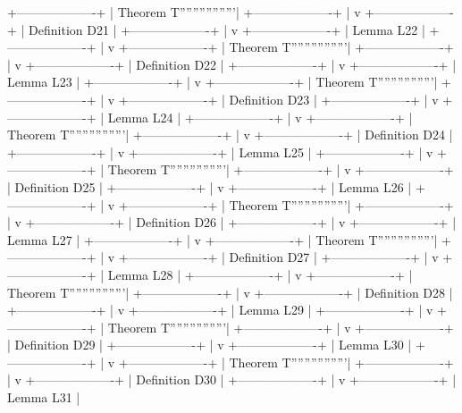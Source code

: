 +-------------------+
| Theorem T'''''''''''''''''|
+-------------------+
        |
        v
+-------------------+
| Definition D21    |
+-------------------+
        |
        v
+-------------------+
| Lemma L22         |
+-------------------+
        |
        v
+-------------------+
| Theorem T'''''''''''''''''|
+-------------------+
        |
        v
+-------------------+
| Definition D22    |
+-------------------+
        |
        v
+-------------------+
| Lemma L23         |
+-------------------+
        |
        v
+-------------------+
| Theorem T'''''''''''''''''|
+-------------------+
        |
        v
+-------------------+
| Definition D23    |
+-------------------+
        |
        v
+-------------------+
| Lemma L24         |
+-------------------+
        |
        v
+-------------------+
| Theorem T'''''''''''''''''|
+-------------------+
        |
        v
+-------------------+
| Definition D24    |
+-------------------+
        |
        v
+-------------------+
| Lemma L25         |
+-------------------+
        |
        v
+-------------------+
| Theorem T'''''''''''''''''|
+-------------------+
        |
        v
+-------------------+
| Definition D25    |
+-------------------+
        |
        v
+-------------------+
| Lemma L26         |
+-------------------+
        |
        v
+-------------------+
| Theorem T'''''''''''''''''|
+-------------------+
        |
        v
+-------------------+
| Definition D26    |
+-------------------+
        |
        v
+-------------------+
| Lemma L27         |
+-------------------+
        |
        v
+-------------------+
| Theorem T'''''''''''''''''|
+-------------------+
        |
        v
+-------------------+
| Definition D27    |
+-------------------+
        |
        v
+-------------------+
| Lemma L28         |
+-------------------+
        |
        v
+-------------------+
| Theorem T'''''''''''''''''|
+-------------------+
        |
        v
+-------------------+
| Definition D28    |
+-------------------+
        |
        v
+-------------------+
| Lemma L29         |
+-------------------+
        |
        v
+-------------------+
| Theorem T'''''''''''''''''|
+-------------------+
        |
        v
+-------------------+
| Definition D29    |
+-------------------+
        |
        v
+-------------------+
| Lemma L30         |
+-------------------+
        |
        v
+-------------------+
| Theorem T'''''''''''''''''|
+-------------------+
        |
        v
+-------------------+
| Definition D30    |
+-------------------+
        |
        v
+-------------------+
| Lemma L31         |
